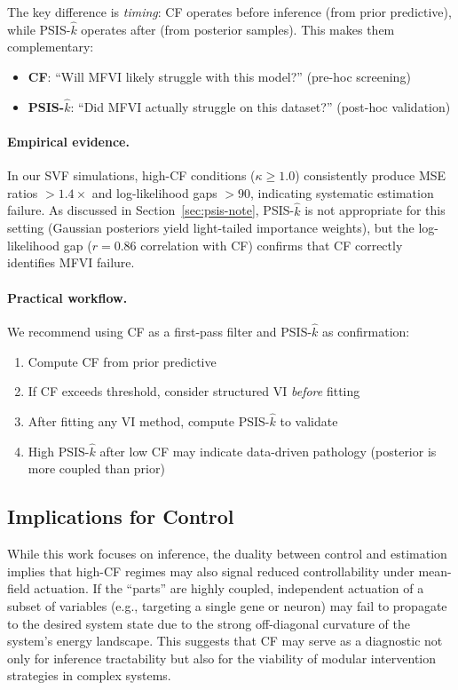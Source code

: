 \documentclass[10pt]{article} %
\theoremstyle{plain}
\theoremstyle{definition}
\begin{document}
The key difference is \emph{timing}: CF operates before inference (from prior predictive), while PSIS-$\hat{k}$ operates after (from posterior samples). This makes them complementary:
\begin{itemize}
    \item \textbf{CF}: ``Will MFVI likely struggle with this model?'' (pre-hoc screening)
    \item \textbf{PSIS-$\hat{k}$}: ``Did MFVI actually struggle on this dataset?'' (post-hoc validation)
\end{itemize}

\paragraph{Empirical evidence.} In our SVF simulations, high-CF conditions ($\kappa \geq 1.0$) consistently produce MSE ratios $> 1.4\times$ and log-likelihood gaps $> 90$, indicating systematic estimation failure. As discussed in Section~\ref{sec:psis-note}, PSIS-$\hat{k}$ is not appropriate for this setting (Gaussian posteriors yield light-tailed importance weights), but the log-likelihood gap ($r = 0.86$ correlation with CF) confirms that CF correctly identifies MFVI failure.

\paragraph{Practical workflow.} We recommend using CF as a first-pass filter and PSIS-$\hat{k}$ as confirmation:
\begin{enumerate}
    \item Compute CF from prior predictive
    \item If CF exceeds threshold, consider structured VI \emph{before} fitting
    \item After fitting any VI method, compute PSIS-$\hat{k}$ to validate
    \item High PSIS-$\hat{k}$ after low CF may indicate data-driven pathology (posterior is more coupled than prior)
\end{enumerate}

\subsection{Implications for Control}

While this work focuses on inference, the duality between control and estimation implies that high-CF regimes may also signal reduced controllability under mean-field actuation. If the ``parts'' are highly coupled, independent actuation of a subset of variables (e.g., targeting a single gene or neuron) may fail to propagate to the desired system state due to the strong off-diagonal curvature of the system's energy landscape. This suggests that CF may serve as a diagnostic not only for inference tractability but also for the viability of modular intervention strategies in complex systems.
\end{document}

